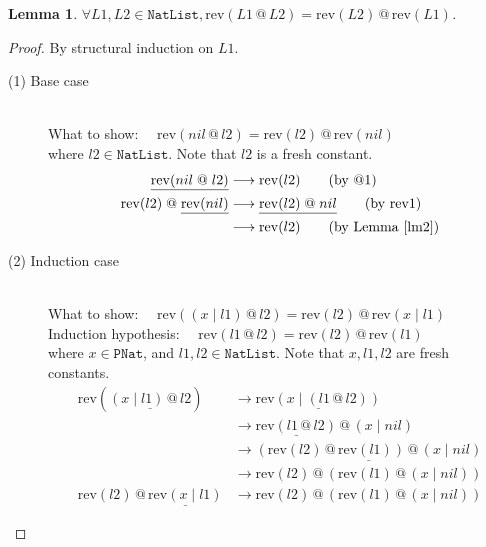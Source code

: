 \documentclass[12pt, a4paper]{article}
\newtheorem{lemma}[theorem]{Lemma}
\newcommand{\rel}[1]{\mathrel{#1}}
\newcommand{\rmx}[1]{\mathrm{#1}}
\newcommand{\larrow}{\longrightarrow}
\newcommand{\under}{\underline}
\begin{document}
\begin{lemma}
\label{lm1}
$\forall L1, L2 \in \mathtt{NatList}, \rmx{rev}(L1 \rel{@} L2) = \rmx{rev}(L2) \rel{@} \rmx{rev}(L1)$.
\end{lemma}
\begin{proof}
By structural induction on $L1$.

\begin{description}

\item[(1) Base case]~\\
\noindent
What to show: $\quad \rmx{rev}(nil \rel{@} l2) = \rmx{rev}(l2) \rel{@} \rmx{rev}(nil)$\\
where $l2 \in \mathtt{NatList}$. Note that $l2$ is a fresh constant.
\begin{align*}
\under{\rmx{rev}(nil \rel{@} l2)}
	&\larrow \rmx{rev}(l2) \tag{by @1} \\
\rmx{rev}(l2) \rel{@} \under{\rmx{rev}(nil)}
	&\larrow \under{\rmx{rev}(l2) \rel{@} nil} \tag{by rev1} \\
	&\larrow \rmx{rev}(l2) \tag{by Lemma~\ref{lm2}}
\end{align*}

\item[(2) Induction case]~\\
What to show: $\quad \rmx{rev}((x \rel{|} l1) \rel{@} l2) = \rmx{rev}(l2) \rel{@} \rmx{rev}(x \rel{|} l1)$ \\
Induction hypothesis: $\quad \rmx{rev}(l1 \rel{@} l2) = \rmx{rev}(l2) \rel{@} \rmx{rev}(l1)$  \\
where $x \in \mathtt{PNat}$, and $l1, l2 \in \mathtt{NatList}$. Note that $x, l1, l2$ are fresh constants.
\begin{align*}
\rmx{rev}(\under{(x \rel{|} l1) \rel{@} l2}) 
	&\larrow \under{\rmx{rev}(x \rel{|} (l1 \rel{@} l2))} \tag{by @2} \\
	&\larrow \under{\rmx{rev}(l1 \rel{@} l2)} \rel{@} (x \rel{|} nil) \tag{by rev2} \\
	&\larrow \under{(\rmx{rev}(l2) \rel{@} \rmx{rev}(l1)) \rel{@} (x \rel{|} nil)} \tag{by IH} \\
	&\larrow \rmx{rev}(l2) \rel{@} (\rmx{rev}(l1) \rel{@} (x \rel{|} nil)) \tag{by Lemma 2 in Problem 2} \\
\rmx{rev}(l2) \rel{@} \under{\rmx{rev}(x \rel{|} l1)}
	&\larrow \rmx{rev}(l2) \rel{@} (\rmx{rev}(l1) \rel{@} (x \rel{|} nil)) \tag{by rev2}
\end{align*}

\end{description}
\end{proof}
\end{document}

